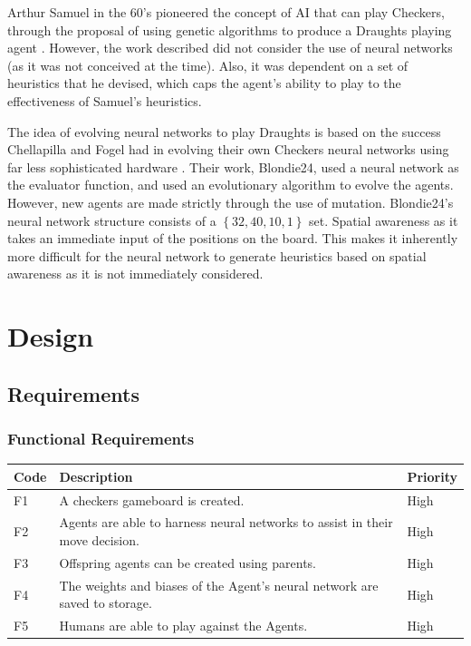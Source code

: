 \documentclass[12pt,a4paper]{article}
\begin{document}
    Arthur Samuel in the 60's pioneered the concept of AI that can play Checkers, through the proposal of using genetic algorithms to produce a Draughts playing agent \cite{samuel_studies_2000}. However, the work described did not consider the use of neural networks (as it was not conceived at the time). Also, it was dependent on a set of heuristics that he devised, which caps the agent's ability to play to the effectiveness of Samuel's heuristics. 

    The idea of evolving neural networks to play Draughts is based on the success Chellapilla and Fogel had in evolving their own Checkers neural networks using far less sophisticated hardware \cite{chellapilla_evolving_1999}. Their work, Blondie24, used a neural network as the evaluator function, and used an evolutionary algorithm to evolve the agents. However, new agents are made strictly through the use of mutation. Blondie24's neural network structure consists of a $\left\{ 32,40,10,1 \right\}$ set. Spatial awareness as it takes an immediate input of the positions on the board. This makes it inherently more difficult for the neural network to generate heuristics based on spatial awareness as it is not immediately considered.


\section{Design}

\subsection*{Requirements}

    \subsubsection*{Functional Requirements}


    \begin{center}
        \begin{tabular}{| l  | l | l |}
        \hline
        Code & Description & Priority \\ \hline
        F1 & A checkers gameboard is created.& High  \\ \hline
        F2 &  Agents are able to harness neural networks to assist in their move decision.& High  \\ \hline
        F3 &  Offspring agents can be created using parents. & High \\ \hline
        F4 &  The weights and biases of the Agent's neural network are saved to storage.& High  \\ \hline
        F5 &  Humans are able to play against the Agents. & High \\ \hline
        \end{tabular}
    \end{center}
\end{document}
